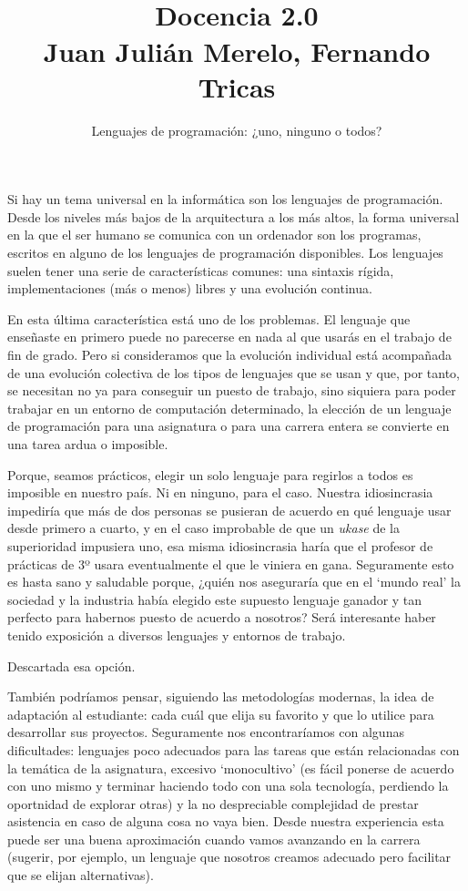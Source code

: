 \documentclass[twoside,10pt]{article}
\title{\ \\ Docencia 2.0\\ \large Juan Juli\'{a}n Merelo, Fernando Tricas}
\author{\LARGE Lenguajes de programación: ¿uno, ninguno o todos?}
\date{}
\newcounter{vol}
\begin{document}
\addtocounter{page}{2}

\maketitle
\vspace*{-5ex}

\begin{multicols}{2}

Si hay un tema universal en la informática son los lenguajes de
programación. Desde los niveles más bajos de la arquitectura a los más
altos, la forma universal en la que el ser humano se comunica con un
ordenador son los programas, escritos en alguno de los lenguajes de
programación disponibles. Los lenguajes suelen tener una serie de
características comunes: una sintaxis rígida, implementaciones (más o
menos) libres y una evolución continua.

En esta última característica está uno de los problemas. El lenguaje
que enseñaste en primero puede no parecerse en nada al que usarás en
el trabajo de fin de grado. Pero si consideramos que la evolución
individual está acompañada de una evolución colectiva de los tipos de
lenguajes que se usan y que, por tanto, se necesitan no ya para
conseguir un puesto de trabajo, sino siquiera para poder trabajar en
un entorno de computación determinado, la elección de un lenguaje de
programación para una asignatura o para una carrera entera se convierte en
una tarea ardua o imposible.

Porque, seamos prácticos, elegir un solo lenguaje para regirlos a
todos es imposible en nuestro país. Ni en ninguno, para el caso.
Nuestra idiosincrasia impediría que más de dos personas se pusieran de
acuerdo en qué lenguaje usar desde primero a cuarto, y en el caso
improbable de que un {\em ukase} de la superioridad impusiera uno, esa
misma idiosincrasia haría que el profesor de prácticas de 3º usara
eventualmente el que le viniera en gana. 
Seguramente esto es hasta sano y saludable porque, ¿quién nos aseguraría
que en el `mundo real' la sociedad y la industria había elegido este
supuesto lenguaje ganador y tan perfecto para habernos puesto de acuerdo a
nosotros? Será interesante haber tenido exposición a diversos lenguajes y
entornos de trabajo.

Descartada esa opción.

También podríamos pensar, siguiendo las metodologías modernas, la idea de
adaptación al estudiante: cada cuál que elija su favorito y que lo utilice
para desarrollar sus proyectos. Seguramente nos encontraríamos con algunas
dificultades: lenguajes poco adecuados para las tareas que están
relacionadas con la temática de la asignatura, excesivo `monocultivo' (es
fácil ponerse de acuerdo con uno mismo y terminar haciendo todo con una
sola tecnología, perdiendo la oportnidad de explorar otras) y la no
despreciable complejidad de prestar asistencia en caso de alguna cosa no
vaya bien. 
Desde nuestra experiencia esta puede ser una buena aproximación cuando
vamos avanzando en la carrera (sugerir, por ejemplo, un lenguaje que
nosotros creamos adecuado pero facilitar que se elijan alternativas).


\end{multicols}
\end{document}
